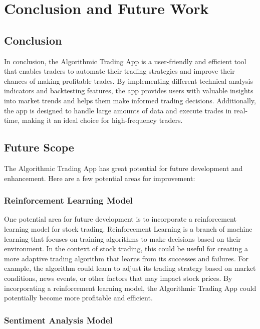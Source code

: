 
\chapter{Conclusion and Future Work} %

\label{Chapter5} %

\section{Conclusion}

In conclusion, the Algorithmic Trading App is a user-friendly and efficient tool that enables traders to automate their trading strategies and improve their chances of making profitable trades. By implementing different technical analysis indicators and backtesting features, the app provides users with valuable insights into market trends and helps them make informed trading decisions. Additionally, the app is designed to handle large amounts of data and execute trades in real-time, making it an ideal choice for high-frequency traders.

\section{Future Scope}

The Algorithmic Trading App has great potential for future development and enhancement. Here are a few potential areas for improvement:

\subsection{Reinforcement Learning Model}

One potential area for future development is to incorporate a reinforcement learning model for stock trading. Reinforcement Learning is a branch of machine learning that focuses on training algorithms to make decisions based on their environment. In the context of stock trading, this could be useful for creating a more adaptive trading algorithm that learns from its successes and failures. For example, the algorithm could learn to adjust its trading strategy based on market conditions, news events, or other factors that may impact stock prices. By incorporating a reinforcement learning model, the Algorithmic Trading App could potentially become more profitable and efficient.

\subsection{Sentiment Analysis Model}

